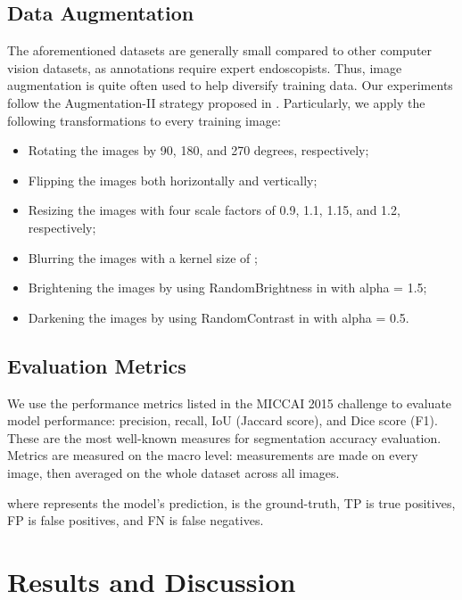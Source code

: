 \documentclass[review, sort&compress]{elsarticle}
\begin{document}
\subsection{Data Augmentation}
The aforementioned datasets are generally small compared to other computer vision datasets, as annotations require expert endoscopists. Thus, image augmentation is quite often used to help diversify training data. Our experiments follow the Augmentation-II strategy proposed in \cite{shin2018automatic}. Particularly, we apply the following transformations to every training image:
\begin{itemize}
\item Rotating the images by 90, 180, and 270 degrees, respectively;
\item Flipping the images both horizontally and vertically;
\item Resizing the images with four scale factors of 0.9, 1.1, 1.15, and 1.2, respectively;
\item Blurring the images with a kernel size of ;
\item Brightening the images by using RandomBrightness in \cite{albumentations} with alpha = 1.5;
\item Darkening the images by using RandomContrast in \cite{albumentations} with alpha = 0.5.
\end{itemize}

\subsection{Evaluation Metrics}
We use the performance metrics listed in the MICCAI 2015 challenge \cite{miccai_polyp} to evaluate model performance: precision, recall, IoU (Jaccard score), and Dice score (F1). These are the most well-known measures for segmentation accuracy evaluation. Metrics are measured on the macro level: measurements are made on every image, then averaged on the whole dataset across all images.

where  represents the model's prediction,  is the ground-truth, TP is true positives, FP is false positives, and FN is false negatives.

\section{Results and Discussion}
\label{sec:results}
\end{document}
